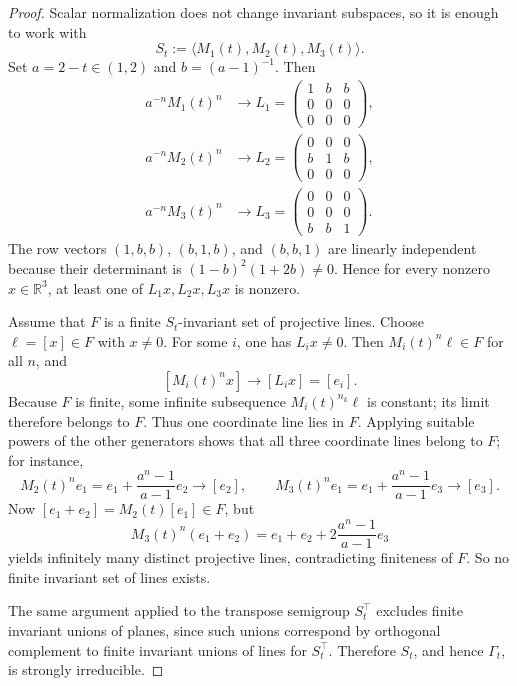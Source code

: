 \documentclass[10pt,a4paper]{amsart}
\newcommand{\R}{\mathbb{R}}
\begin{document}
\begin{proof}
Scalar normalization does not change invariant subspaces, so it is enough to work with
\[
S_t:=\langle M_1(t),M_2(t),M_3(t)\rangle.
\]
Set $a=2-t\in(1,2)$ and $b=(a-1)^{-1}$. Then
\begin{align*}
a^{-n}M_1(t)^n &\longrightarrow
L_1=
\begin{pmatrix}
1&b&b\\
0&0&0\\
0&0&0
\end{pmatrix},\\
a^{-n}M_2(t)^n &\longrightarrow
L_2=
\begin{pmatrix}
0&0&0\\
b&1&b\\
0&0&0
\end{pmatrix},\\
a^{-n}M_3(t)^n &\longrightarrow
L_3=
\begin{pmatrix}
0&0&0\\
0&0&0\\
b&b&1
\end{pmatrix}.
\end{align*}
The row vectors $(1,b,b)$, $(b,1,b)$, and $(b,b,1)$ are linearly independent because their determinant is $(1-b)^2(1+2b)\neq0$. Hence for every nonzero $x\in\R^3$, at least one of $L_1x,L_2x,L_3x$ is nonzero.

Assume that $F$ is a finite $S_t$-invariant set of projective lines. Choose $\ell=[x]\in F$ with $x\neq0$. For some $i$, one has $L_ix\neq0$. Then $M_i(t)^n\ell\in F$ for all $n$, and
\[
[M_i(t)^n x]\longrightarrow [L_i x]=[e_i].
\]
Because $F$ is finite, some infinite subsequence $M_i(t)^{n_k}\ell$ is constant; its limit therefore belongs to $F$. Thus one coordinate line lies in $F$. Applying suitable powers of the other generators shows that all three coordinate lines belong to $F$; for instance,
\[
M_2(t)^n e_1 = e_1+\frac{a^n-1}{a-1}e_2 \longrightarrow [e_2],
\qquad
M_3(t)^n e_1 = e_1+\frac{a^n-1}{a-1}e_3 \longrightarrow [e_3].
\]
Now $[e_1+e_2]=M_2(t)[e_1]\in F$, but
\[
M_3(t)^n(e_1+e_2)=e_1+e_2+2\frac{a^n-1}{a-1}e_3
\]
yields infinitely many distinct projective lines, contradicting finiteness of $F$. So no finite invariant set of lines exists.

The same argument applied to the transpose semigroup $S_t^\top$ excludes finite invariant unions of planes, since such unions correspond by orthogonal complement to finite invariant unions of lines for $S_t^\top$. Therefore $S_t$, and hence $\Gamma_t$, is strongly irreducible.
\end{proof}
\end{document}
